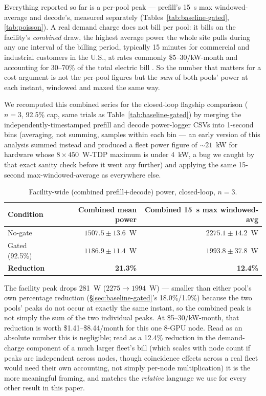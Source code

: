 \documentclass[sigconf,review,anonymous]{acmart}
\begin{document}
Everything reported so far is a per-pool peak --- prefill's 15~s max windowed-average and
decode's, measured separately (Tables~\ref{tab:baseline-gated}, \ref{tab:poisson}). A real
demand charge does not bill per pool: it bills on the facility's \emph{combined} draw, the
highest average power the whole site pulls during any one interval of the billing period,
typically 15 minutes for commercial and industrial customers in the U.S., at rates commonly
\$5--30/kW-month and accounting for 30--70\% of the total electric bill
\cite{mclaren2017demandcharges}. So the number that matters for a cost argument is not the
per-pool figures but the \emph{sum} of both pools' power at each instant, windowed and maxed
the same way.

We recomputed this combined series for the closed-loop flagship comparison ($n{=}3$, 92.5\%
cap, same trials as Table~\ref{tab:baseline-gated}) by merging the independently-timestamped
prefill and decode power-logger CSVs into 1-second bins (averaging, not summing, samples within
each bin --- an early version of this analysis summed instead and produced a fleet power figure
of ${\sim}21$~kW for hardware whose $8\times450$~W-TDP maximum is under 4~kW, a bug we caught
by that exact sanity check before it went any further) and applying the same 15-second
max-windowed-average as everywhere else.

\begin{table}[t]
  \caption{Facility-wide (combined prefill+decode) power, closed-loop, $n{=}3$.}
  \label{tab:combined-power}
  \footnotesize
  \begin{tabular}{@{}lrr@{}}
    \toprule
    Condition & Combined mean power & Combined 15~s max windowed-avg \\
    \midrule
    No-gate            & $1507.5\pm13.6$~W & $2275.1\pm14.2$~W \\
    Gated (92.5\%)     & $1186.9\pm11.4$~W & $1993.8\pm37.8$~W \\
    \textbf{Reduction} & \textbf{21.3\%}    & \textbf{12.4\%} \\
    \bottomrule
  \end{tabular}
\end{table}

The facility peak drops 281~W ($2275\rightarrow1994$~W) --- smaller than either pool's own
percentage reduction (\S\ref{sec:baseline-gated}'s 18.0\%/1.9\%) because the two pools' peaks
do not occur at exactly the same instant, so the combined peak is not simply the sum of the two
individual peaks. At \$5--30/kW-month, that reduction is worth \$1.41--\$8.44/month for this
one 8-GPU node. Read as an absolute number this is negligible; read as a 12.4\% reduction in
the demand-charge component of a much larger fleet's bill (which scales with node count if
peaks are independent across nodes, though coincidence effects across a real fleet would need
their own accounting, not simply per-node multiplication) it is the more meaningful framing,
and matches the \emph{relative} language we use for every other result in this paper.
\end{document}
